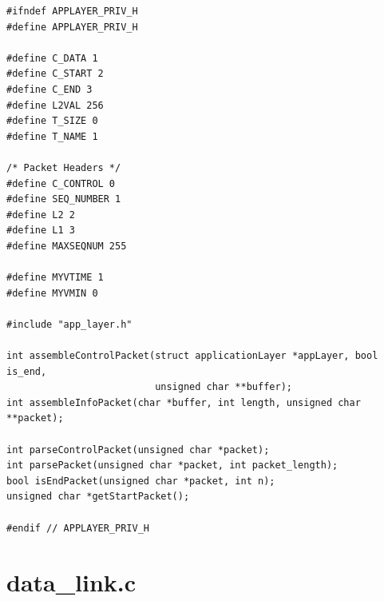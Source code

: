 \documentclass[11pt]{report}
\begin{document}
\begin{lstlisting}
#ifndef APPLAYER_PRIV_H
#define APPLAYER_PRIV_H

#define C_DATA 1
#define C_START 2
#define C_END 3
#define L2VAL 256
#define T_SIZE 0
#define T_NAME 1

/* Packet Headers */
#define C_CONTROL 0
#define SEQ_NUMBER 1
#define L2 2
#define L1 3
#define MAXSEQNUM 255

#define MYVTIME 1
#define MYVMIN 0

#include "app_layer.h"

int assembleControlPacket(struct applicationLayer *appLayer, bool is_end,
                          unsigned char **buffer);
int assembleInfoPacket(char *buffer, int length, unsigned char **packet);

int parseControlPacket(unsigned char *packet);
int parsePacket(unsigned char *packet, int packet_length);
bool isEndPacket(unsigned char *packet, int n);
unsigned char *getStartPacket();

#endif // APPLAYER_PRIV_H
\end{lstlisting}

\section{data\_link.c}
\end{document}
